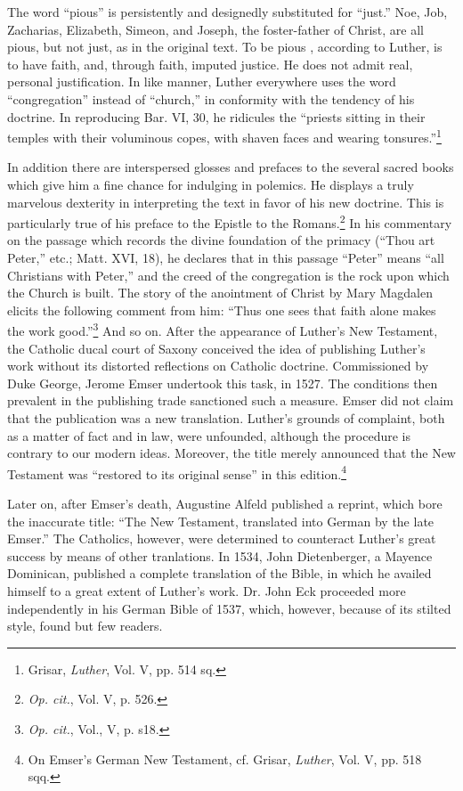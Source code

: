 The word “pious” is persistently and designedly substituted for “just.”
Noe, Job, Zacharias, Elizabeth, Simeon, and Joseph, the foster-father of
Christ, are all pious, but not just, as in the original text. To be pious
, according to Luther, is to have faith, and, through faith, imputed justice. He
does not admit real, personal justification. In like manner, Luther everywhere
uses the word “congregation” instead of “church,” in conformity
with the tendency of his doctrine. In reproducing Bar. VI, 30, he ridicules
the “priests sitting in their temples with their voluminous copes, with shaven
faces and wearing tonsures.”\footnote{Grisar, \textit{Luther}, Vol. V, pp. 514 sq.}


In addition there are interspersed glosses and prefaces to the several
sacred books which give him a fine chance for indulging in polemics.
He displays a truly marvelous dexterity in interpreting the text in
favor of his new doctrine. This is particularly true of his preface to
the Epistle to the Romans.\footnote{\textit{Op. cit.}, Vol. V, p. 526.}
 In his commentary on the passage which
records the divine foundation of the primacy (“Thou art Peter,” etc.;
Matt. XVI, 18), he declares that in this passage “Peter” means “all
Christians with Peter,” and the creed of the congregation is the rock
upon which the Church is built. The story of the anointment of
Christ by Mary Magdalen elicits the following comment from him:
“Thus one sees that faith alone makes the work good.”\footnote{\textit{Op. cit.}, Vol., V, p. s18.}
 And so on.
After the appearance of Luther’s New Testament, the Catholic
ducal court of Saxony conceived the idea of publishing Luther’s work
without its distorted reflections on Catholic doctrine. Commissioned
by Duke George, Jerome Emser undertook this task, in 1527. The
conditions then prevalent in the publishing trade sanctioned such a
measure. Emser did not claim that the publication was a new translation.
Luther’s grounds of complaint, both as a matter of fact and
in law, were unfounded, although the procedure is contrary to our
modern ideas. Moreover, the title merely announced that the New
Testament was “restored to its original sense” in this edition.\footnote{On Emser’s German New Testament, cf. Grisar, \textit{Luther}, Vol. V, pp. 518 sqq.}

Later on, after Emser’s death, Augustine Alfeld published a reprint, which
bore the inaccurate title: “The New Testament, translated into German
by the late Emser.” The Catholics, however, were determined to
counteract Luther’s great success by means of other tranlations. In
1534, John Dietenberger, a Mayence Dominican, published a complete
translation of the Bible, in which he availed himself to a great
extent of Luther’s work. Dr. John Eck proceeded more independently in
his German Bible of 1537, which, however, because of its
stilted style, found but few readers.

